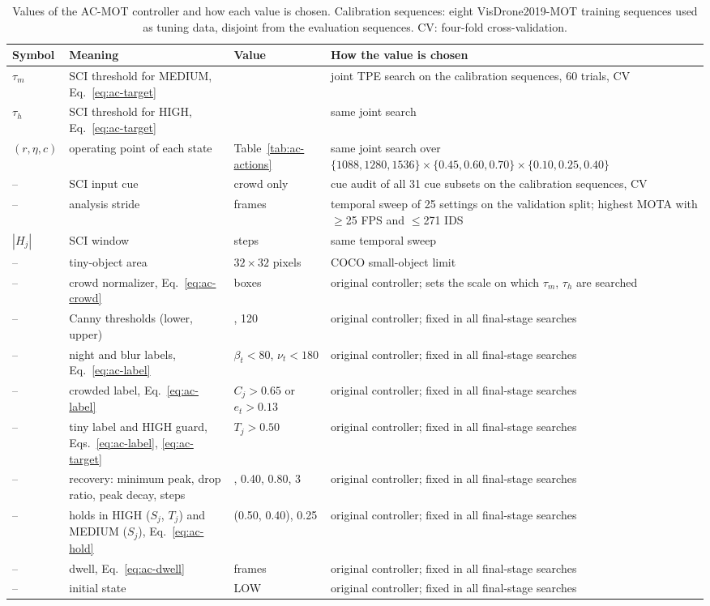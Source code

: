 \begin{table}[tbp]
\centering
\caption{Values of the AC-MOT controller and how each value is chosen. Calibration sequences: eight VisDrone2019-MOT training sequences used as tuning data, disjoint from the evaluation sequences. CV: four-fold cross-validation.}
\label{tab:ac-constants}
\begin{tabular}{>{\raggedright\arraybackslash}p{1.6cm}>{\raggedright\arraybackslash}p{4.6cm}>{\raggedright\arraybackslash}p{2.6cm}>{\raggedright\arraybackslash}p{5.6cm}}
\toprule
Symbol & Meaning & Value & How the value is chosen\\
\midrule
$\tau_m$ & SCI threshold for MEDIUM, Eq.~\eqref{eq:ac-target} & 0.297 & joint TPE search on the calibration sequences, 60 trials, CV\\
$\tau_h$ & SCI threshold for HIGH, Eq.~\eqref{eq:ac-target} & 0.511 & same joint search\\
$(r,\eta,c)$ & operating point of each state & Table~\ref{tab:ac-actions} & same joint search over $\{1088,1280,1536\}\times\{0.45,0.60,0.70\}\times\{0.10,0.25,0.40\}$\\
-- & SCI input cue & crowd only & cue audit of all 31 cue subsets on the calibration sequences, CV\\
-- & analysis stride & 10 frames & temporal sweep of 25 settings on the validation split; highest MOTA with $\geq$25 FPS and $\leq$271 IDS\\
$|H_j|$ & SCI window & 7 steps & same temporal sweep\\
-- & tiny-object area & $32\times32$ pixels & COCO small-object limit \cite{lin2014coco}\\
-- & crowd normalizer, Eq.~\eqref{eq:ac-crowd} & 30 boxes & original controller; sets the scale on which $\tau_m$, $\tau_h$ are searched\\
-- & Canny thresholds (lower, upper) & 50, 120 & original controller; fixed in all final-stage searches\\
-- & night and blur labels, Eq.~\eqref{eq:ac-label} & $\beta_t<80$, $\nu_t<180$ & original controller; fixed in all final-stage searches\\
-- & crowded label, Eq.~\eqref{eq:ac-label} & $C_j>0.65$ or $e_t>0.13$ & original controller; fixed in all final-stage searches\\
-- & tiny label and HIGH guard, Eqs.~\eqref{eq:ac-label}, \eqref{eq:ac-target} & $T_j>0.50$ & original controller; fixed in all final-stage searches\\
-- & recovery: minimum peak, drop ratio, peak decay, steps & 5, 0.40, 0.80, 3 & original controller; fixed in all final-stage searches\\
-- & holds in HIGH ($S_j$, $T_j$) and MEDIUM ($S_j$), Eq.~\eqref{eq:ac-hold} & (0.50, 0.40), 0.25 & original controller; fixed in all final-stage searches\\
-- & dwell, Eq.~\eqref{eq:ac-dwell} & 30 frames & original controller; fixed in all final-stage searches\\
-- & initial state & LOW & original controller; fixed in all final-stage searches\\
\bottomrule
\end{tabular}
\end{table}

